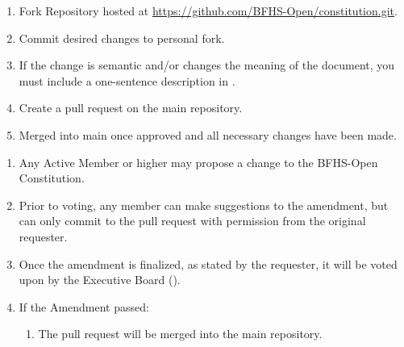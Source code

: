 
\begin{enumerate}
	\item Fork Repository hosted at \href{https://github.com/BFHS-Open/constitution.git}{https://github.com/BFHS-Open/constitution.git}.

	\item Commit desired changes to personal fork.

	\item If the change is semantic and/or changes the meaning of the document,
		you must include a one-sentence description in .

	\item Create a pull request on the main repository.

	\item Merged into main once approved and all necessary changes have been made.
\end{enumerate}

\begin{enumerate}
	\item Any Active Member or higher may propose a change to the BFHS-Open Constitution.

	\item Prior to voting, any member can make suggestions to the amendment, but can
		only commit to the pull request with permission from the original requester.

	\item Once the amendment is finalized, as stated by the requester, it will be voted
		upon by the Executive Board ().

	\item If the Amendment passed:
		\begin{enumerate}
			\item The pull request will be merged into the main repository.
		\end{enumerate}
\end{enumerate}